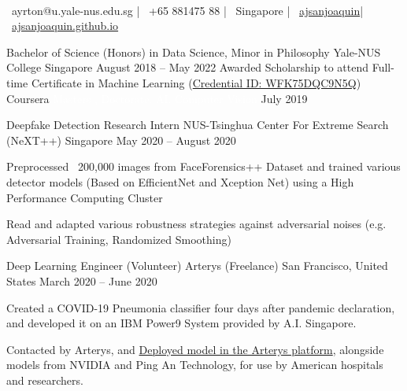 \documentclass[]{awesome-cv}
\begin{document}
    
\begin{center}
	 \  \\
	{\faEnvelope\ ayrton@u.yale-nus.edu.sg} | {\faMobile\ +65 881475 88} | {\faMapMarker\ Singapore} | {\faLinkedinSquare\ \href{https://www.linkedin.com/in/ajsanjoaquin/}{ajsanjoaquin}}| {\faLink\ \href{http://ajsanjoaquin.github.io/}{ajsanjoaquin.github.io}}
\end{center}
\begin{cventries}
	\cventry
	{Bachelor of Science (Honors) in Data Science, Minor in Philosophy}
	{Yale-NUS College}
	{Singapore}
	{August 2018 – May 2022}
	{Awarded Scholarship to attend Full-time}
	\cventry
	{Certificate in Machine Learning (\href{https://www.coursera.org/account/accomplishments/verify/WFK75DQC9N5Q}{Credential ID: WFK75DQC9N5Q})}
	{Coursera
	\textcolor{white}{Masters , Doctorate, AI, Computer Vision}}
	{}
	{July 2019}
	{}
\end{cventries}
\vspace{-8mm}
\begin{cventries}
	\cventry
	{Deepfake Detection Research Intern}
	{NUS-Tsinghua Center For Extreme Search (NeXT++)}
	{Singapore}
	{May 2020 – August 2020}
	{\begin{cvitems}
		\item {Preprocessed ~200,000 images from FaceForensics++ Dataset and trained various detector models (Based on EfficientNet and Xception Net) using a High Performance Computing Cluster}
		\item {Read and adapted various robustness strategies against adversarial noises (e.g. Adversarial Training, Randomized Smoothing)}
		\end{cvitems}}
	\cventry
	{Deep Learning Engineer (Volunteer)}
	{Arterys (Freelance)}
	{San Francisco, United States}
	{March 2020 – June 2020}
	{\begin{cvitems}
		\item {Created a COVID-19 Pneumonia classifier four days after pandemic declaration, and developed it on an IBM Power9 System provided by A.I. Singapore.}
		\item {Contacted by Arterys, and \href{https://marketplace.arterys.com/model/ayrtoncovidXR}{Deployed model in the Arterys platform}, 
		alongside models from NVIDIA and Ping An Technology, for use by American hospitals and researchers.}
		\end{cvitems}}
\end{cventries}
\end{document}
